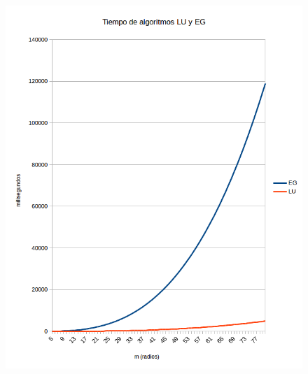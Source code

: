 \begin{figure}[h]
  \center
  \includegraphics[scale=0.8]{imagenes/tiempoLUyEGsinDividir.png}
  \label{fig:luyeg}
\end{figure}







